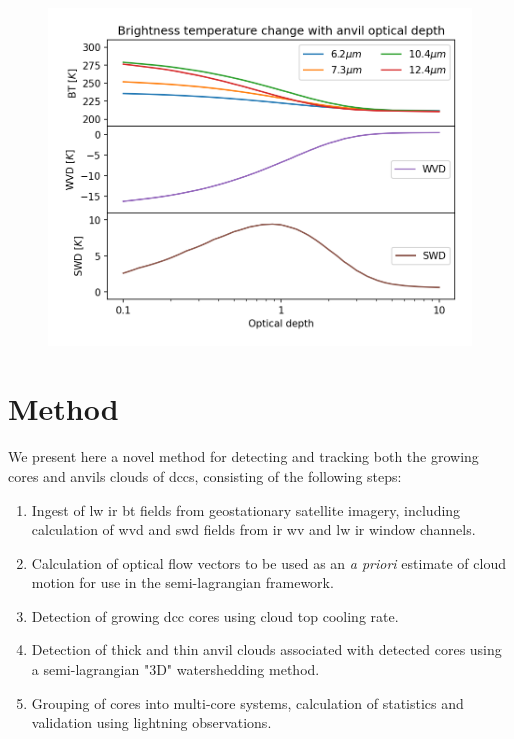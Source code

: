 \begin{figure}[t]
    \includegraphics[width=\textwidth]{figures/chapter1_09.png}
    \caption[
    Simulated \acrshort{abi} \acrshort{bt} observations for a \acrshort{dcc} core of decreasing optical depth
    ]{}
    \label{fig:optical_depth_channels}
\end{figure}


\section{Method}

We present here a novel method for detecting and tracking both the growing cores and anvils clouds of \acrshort{dcc}s, consisting of the following steps:

\begin{enumerate}
    \item Ingest of \acrshort{lw} \acrshort{ir} \acrshort{bt} fields from geostationary satellite imagery, including calculation of \acrshort{wvd} and \acrshort{swd} fields from \acrshort{ir} \acrshort{wv} and \acrshort{lw} \acrshort{ir} window channels.
    \item Calculation of optical flow vectors to be used as an \textit{a priori} estimate of cloud motion for use in the semi-lagrangian framework.
    \item Detection of growing \acrshort{dcc} cores using cloud top cooling rate.
    \item Detection of thick and thin anvil clouds associated with detected cores using a semi-lagrangian "3D" watershedding method. 
    \item Grouping of cores into multi-core systems, calculation of statistics and validation using lightning observations.
\end{enumerate}



